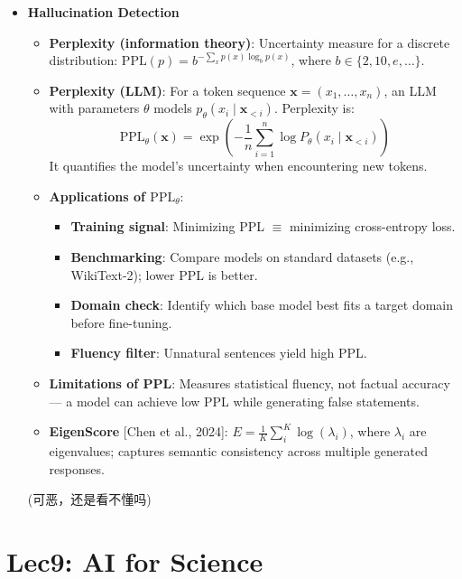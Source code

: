 \documentclass[UTF8]{ctexart}
\begin{document}
\begin{itemize}
    \item \textbf{Hallucination Detection}
    \begin{itemize}
        \item \textbf{Perplexity (information theory)}: Uncertainty measure for a discrete distribution:
        $\mathrm{PPL}(p) = b^{-\sum_x p(x)\log_b p(x)}$, where $b \in \{2, 10, e, \ldots\}$.
        \item \textbf{Perplexity (LLM)}: For a token sequence $\mathbf{x}=(x_1,\ldots,x_n)$, an LLM with parameters $\theta$ models $p_\theta(x_i \mid \mathbf{x}_{<i})$. Perplexity is:
        \[
            \mathrm{PPL}_\theta(\mathbf{x}) = \exp\!\left(-\frac{1}{n}\sum_{i=1}^{n}\log P_\theta(x_i \mid \mathbf{x}_{<i})\right)
        \]
        It quantifies the model's uncertainty when encountering new tokens.
        \item \textbf{Applications of $\mathrm{PPL}_\theta$}:
        \begin{itemize}
            \item \textbf{Training signal}: Minimizing PPL $\equiv$ minimizing cross-entropy loss.
            \item \textbf{Benchmarking}: Compare models on standard datasets (e.g., WikiText-2); lower PPL is better.
            \item \textbf{Domain check}: Identify which base model best fits a target domain before fine-tuning.
            \item \textbf{Fluency filter}: Unnatural sentences yield high PPL.
        \end{itemize}
        \item \textbf{Limitations of PPL}: Measures statistical fluency, not factual accuracy — a model can achieve low PPL while generating false statements.
        \item \textbf{EigenScore} {[Chen et al., 2024]}: $E = \frac{1}{K}\sum_{i}^{K} \log(\lambda_i)$, where $\lambda_i$ are eigenvalues; captures semantic consistency across multiple generated responses.
    \end{itemize}
    (可恶，还是看不懂吗)
\end{itemize}

\section{Lec9: AI for Science}
\end{document}
